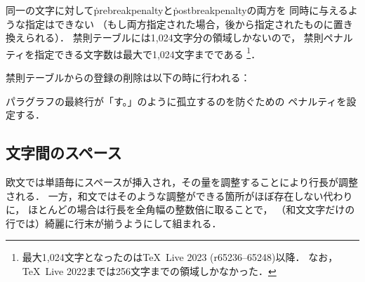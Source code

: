 \documentclass[a4paper,11pt,nomag,dvipdfmx]{jsarticle}
\begin{document}
同一の文字に対して\.{prebreakpenalty}と\.{postbreakpenalty}の両方を
同時に与えるような指定はできない
（もし両方指定された場合，後から指定されたものに置き換えられる）．
禁則テーブルには1,024文字分の領域しかないので，
禁則ペナルティを指定できる文字数は最大で1,024文字までである
\footnote{最大1,024文字となったのは\TeX~Live 2023 (r65236--65248)以降．
なお，\TeX~Live 2022までは256文字までの領域しかなかった．}．

禁則テーブルからの登録の削除は以下の時に行われる\cite{tjb26,tjb57}：

\begin{cslist}
\csitem[\.{jcharwidowpenalty}=<number>]
  パラグラフの最終行が「す。」のように孤立するのを防ぐための
  ペナルティを設定する．
\end{cslist}

\subsection{文字間のスペース}
欧文では単語毎にスペースが挿入され，その量を調整することにより行長が調整される．
一方，和文ではそのような調整ができる箇所がほぼ存在しない代わりに，
ほとんどの場合は行長を全角幅の整数倍に取ることで，
（和文文字だけの行では）綺麗に行末が揃うようにして組まれる．
\end{document}
